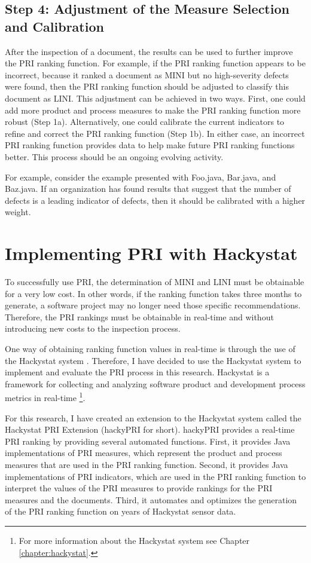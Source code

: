 \subsection{Step 4: Adjustment of the Measure Selection and Calibration}
After the inspection of a document, the results can be used to further
improve the PRI ranking function. For example, if the PRI ranking function
appears to be incorrect, because it ranked a document as MINI but no
high-severity defects were found, then the PRI ranking function should be
adjusted to classify this document as LINI. This adjustment can be achieved
in two ways. First, one could add more product and process measures to make
the PRI ranking function more robust (Step 1a). Alternatively, one could
calibrate the current indicators to refine and correct the PRI ranking
function (Step 1b). In either case, an incorrect PRI ranking function
provides data to help make future PRI ranking functions better. This
process should be an ongoing evolving activity.

For example, consider the example presented with Foo.java, Bar.java, and
Baz.java. If an organization has found results that suggest that the number
of defects is a leading indicator of defects, then it should be calibrated
with a higher weight.



\section{Implementing PRI with Hackystat}
To successfully use PRI, the determination of MINI and LINI must be
obtainable for a very low cost. In other words, if the ranking function
takes three months to generate, a software project may no longer need those
specific recommendations. Therefore, the PRI rankings must be obtainable in
real-time and without introducing new costs to the inspection process. 

One way of obtaining ranking function values in real-time is through the
use of the Hackystat system \cite{Johnson05}. Therefore, I have decided to
use the Hackystat system to implement and evaluate the PRI process in this
research. Hackystat is a framework for collecting and analyzing software
product and development process metrics in real-time \footnote{For more
  information about the Hackystat system see Chapter
  \ref{chapter:hackystat}.}.

For this research, I have created an extension to the Hackystat system
called the Hackystat PRI Extension (hackyPRI for short). hackyPRI provides
a real-time PRI ranking by providing several automated functions. First, it
provides Java implementations of PRI measures, which represent the product
and process measures that are used in the PRI ranking function. Second, it
provides Java implementations of PRI indicators, which are used in the PRI
ranking function to interpret the values of the PRI measures to provide 
rankings for the PRI measures and the documents. Third, it automates and
optimizes the generation of the PRI ranking function on years of Hackystat
sensor data.

